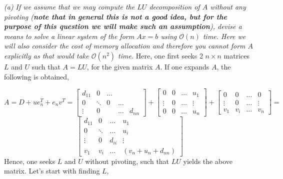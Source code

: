 \documentclass{article}
\begin{document}
\emph{ (a) If we assume that we may compute the $LU$ decomposition of $A$ without any pivoting (\textbf{note that in general this is not a good idea, but for the purpose of this question we will make such an assumption}), devise a means to solve a linear system of the form $Ax=b$ using $\mathcal{O}(n)$ time. Here we will also consider the cost of memory allocation and therefore you cannot form $A$ explicitly as that would take $\mathcal{O}(n^2)$ time.} \newline \newline 
Here, one first seeks 2 $n \times n$ matrices $L$ and $U$ such that $A = LU$, for the given matrix $A$. If one expands $A$, the following is obtained,  

$$ 
 A = D + ue_n^T + e_nv^{T} =   
 \begin{bmatrix}
    d_{11}  &  0 & \dots  \\
     0   &\ddots  & 0 & \dots  \\ 
    \vdots   & 0  &   & \dots & d_{nn}  
\end{bmatrix}  +
\begin{bmatrix}
   0   &  0 & \dots & u_{1}   \\
      \vdots   &0  & \dots  &    \vdots \\ 
     0   &0  & \dots  &    u_{n}  
\end{bmatrix}   + \begin{bmatrix}
   0   &  0 & \dots & 0   \\
      \vdots   &0  & \dots  &    \vdots \\ 
     v_{1}   & v_{i}  & \dots  &    v_{n}  
\end{bmatrix} =  $$ 
$$ 
\begin{bmatrix}
   d_{11}   &  0 & \dots & u_{1}   \\
      0   &    \ddots  & \dots  &    u_{i} \\ 
        \vdots   &    0  & d_{ii}  &    \vdots \\ 
     v_{1}   & v_{i}  & \dots  &    (v_{n} + u_{n} + d_{nn}  )
\end{bmatrix} 
$$ 
\newline
Hence, one seeks $L$ and $U$ without pivoting, such that $LU$ yields the above matrix. Let's start with finding $L$, 
\end{document}
